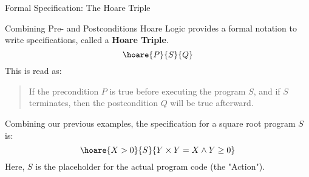 \begin{frame}{Formal Specification: The Hoare Triple}
    \begin{block}{Combining Pre- and Postconditions}
        Hoare Logic provides a formal notation to write specifications, called a \textbf{Hoare Triple}.
        \[ \hoare{P}{S}{Q} \]
        This is read as:
        \begin{quote}
            If the precondition $P$ is true before executing the program $S$, and if $S$ terminates, then the postcondition $Q$ will be true afterward.
        \end{quote}
    \end{block}

    \begin{example}
        Combining our previous examples, the specification for a square root program $S$ is:
        \[ \hoare{X > 0}{S}{Y \times Y = X \wedge Y \ge 0} \]
        Here, $S$ is the placeholder for the actual program code (the "Action").
    \end{example}
\end{frame}